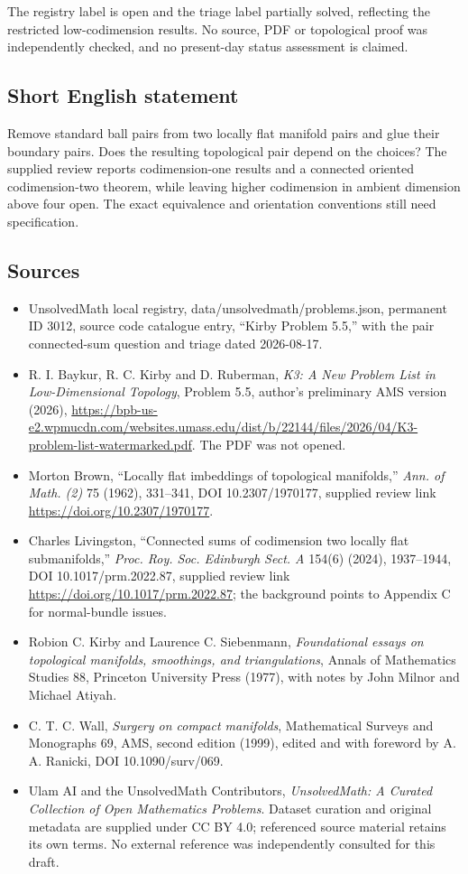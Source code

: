 \documentclass[11pt]{article}
\begin{document}
The registry label is open and the triage label partially solved, reflecting the restricted low-codimension results. No source, PDF or topological proof was independently checked, and no present-day status assessment is claimed.
\subsection{Short English statement}
Remove standard ball pairs from two locally flat manifold pairs and glue their boundary pairs. Does the resulting topological pair depend on the choices? The supplied review reports codimension-one results and a connected oriented codimension-two theorem, while leaving higher codimension in ambient dimension above four open. The exact equivalence and orientation conventions still need specification.
\subsection{Sources}
\begin{itemize}
\item UnsolvedMath local registry, data/unsolvedmath/problems.json, permanent ID 3012, source code catalogue entry, ``Kirby Problem 5.5,'' with the pair connected-sum question and triage dated 2026-08-17.
\item R. I. Baykur, R. C. Kirby and D. Ruberman, \emph{K3: A New Problem List in Low-Dimensional Topology}, Problem 5.5, author's preliminary AMS version (2026), \url{https://bpb-us-e2.wpmucdn.com/websites.umass.edu/dist/b/22144/files/2026/04/K3-problem-list-watermarked.pdf}. The PDF was not opened.
\item [Bro62] Morton Brown, ``Locally flat imbeddings of topological manifolds,'' \emph{Ann. of Math. (2)} 75 (1962), 331--341, DOI 10.2307/1970177, supplied review link \url{https://doi.org/10.2307/1970177}.
\item [Liv24] Charles Livingston, ``Connected sums of codimension two locally flat submanifolds,'' \emph{Proc. Roy. Soc. Edinburgh Sect. A} 154(6) (2024), 1937--1944, DOI 10.1017/prm.2022.87, supplied review link \url{https://doi.org/10.1017/prm.2022.87}; the background points to Appendix C for normal-bundle issues.
\item [KS77] Robion C. Kirby and Laurence C. Siebenmann, \emph{Foundational essays on topological manifolds, smoothings, and triangulations}, Annals of Mathematics Studies 88, Princeton University Press (1977), with notes by John Milnor and Michael Atiyah.
\item [Wal99] C. T. C. Wall, \emph{Surgery on compact manifolds}, Mathematical Surveys and Monographs 69, AMS, second edition (1999), edited and with foreword by A. A. Ranicki, DOI 10.1090/surv/069.
\item Ulam AI and the UnsolvedMath Contributors, \emph{UnsolvedMath: A Curated Collection of Open Mathematics Problems}. Dataset curation and original metadata are supplied under CC BY 4.0; referenced source material retains its own terms. No external reference was independently consulted for this draft.
\end{itemize}
\end{document}
